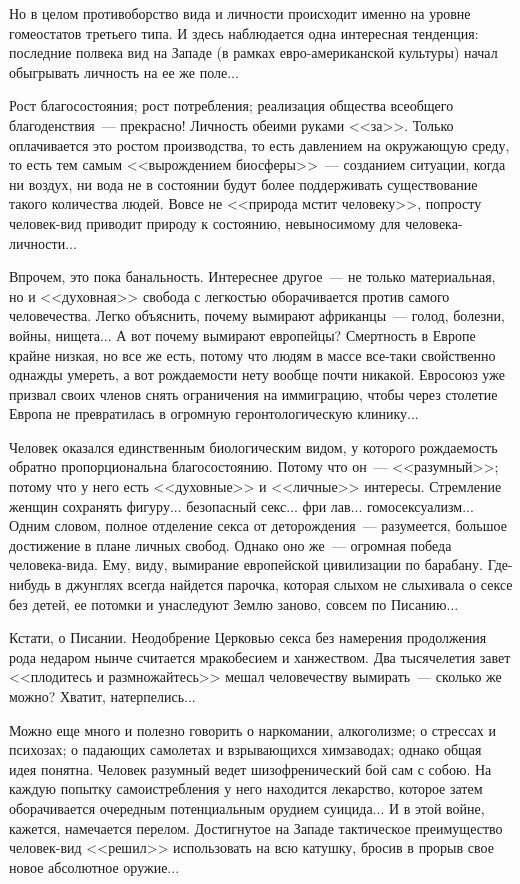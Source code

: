 \documentclass{scrbook}
\newcommand{\flqq}{<<}
\newcommand{\frqq}{>>}
\newcommand{\mdash}{~--- }
\begin{document}
Но в целом противоборство вида и личности происходит именно на уровне гомеостатов третьего типа. И здесь наблюдается одна интересная тенденция: последние полвека вид на Западе (в рамках евро-американской культуры) начал обыгрывать личность на ее же поле...

Рост благосостояния; рост потребления; реализация общества всеобщего благоденствия{\mdash}прекрасно! Личность обеими руками {\flqq}за{\frqq}. Только оплачивается это ростом производства, то есть давлением на окружающую среду, то есть тем самым {\flqq}вырождением биосферы{\frqq}{\mdash}созданием ситуации, когда ни воздух, ни вода не в состоянии будут более поддерживать существование такого количества людей. Вовсе не {\flqq}природа мстит человеку{\frqq}, попросту человек-вид приводит природу к состоянию, невыносимому для человека-личности...

Впрочем, это пока банальность. Интереснее другое{\mdash}не только материальная, но и {\flqq}духовная{\frqq} свобода с легкостью оборачивается против самого человечества. Легко объяснить, почему вымирают африканцы{\mdash}голод, болезни, войны, нищета... А вот почему вымирают европейцы? Смертность в Европе крайне низкая, но все же есть, потому что людям в массе все-таки свойственно однажды умереть, а вот рождаемости нету вообще почти никакой. Евросоюз уже призвал своих членов снять ограничения на иммиграцию, чтобы через столетие Европа не превратилась в огромную геронтологическую клинику...

Человек оказался единственным биологическим видом, у которого рождаемость обратно пропорциональна благосостоянию. Потому что он{\mdash}{\flqq}разумный{\frqq}; потому что у него есть {\flqq}духовные{\frqq} и {\flqq}личные{\frqq} интересы. Стремление женщин сохранять фигуру... безопасный секс... фри лав... гомосексуализм... Одним словом, полное отделение секса от деторождения{\mdash}разумеется, большое достижение в плане личных свобод. Однако оно же{\mdash}огромная победа человека-вида. Ему, виду, вымирание европейской цивилизации по барабану. Где-нибудь в джунглях всегда найдется парочка, которая слыхом не слыхивала о сексе без детей, ее потомки и унаследуют Землю заново, совсем по Писанию...

Кстати, о Писании. Неодобрение Церковью секса без намерения продолжения рода недаром нынче считается мракобесием и ханжеством. Два тысячелетия завет {\flqq}плодитесь и размножайтесь{\frqq} мешал человечеству вымирать{\mdash}сколько же можно? Хватит, натерпелись...

Можно еще много и полезно говорить о наркомании, алкоголизме; о стрессах и психозах; о падающих самолетах и взрывающихся химзаводах; однако общая идея понятна. Человек разумный ведет шизофренический бой сам с собою. На каждую попытку самоистребления у него находится лекарство, которое затем оборачивается очередным потенциальным орудием суицида... И в этой войне, кажется, намечается перелом. Достигнутое на Западе тактическое преимущество человек-вид {\flqq}решил{\frqq} использовать на всю катушку, бросив в прорыв свое новое абсолютное оружие...
\end{document}
